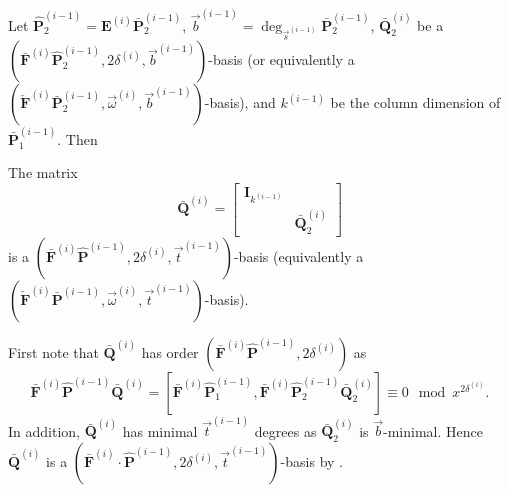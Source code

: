 Let $\hat{\mathbf{P}}_{2}^{\left(i-1\right)}=\mathbf{E}^{\left(i\right)}\bar{\mathbf{P}}_{2}^{\left(i-1\right)}$,
$\vec{b}^{\left(i-1\right)}=\deg_{\vec{s}^{\left(i-1\right)}}\bar{\mathbf{P}}_{2}^{\left(i-1\right)}$,
$\bar{\mathbf{Q}}_{2}^{\left(i\right)}$ be a $(\bar{\mathbf{F}}^{\left(i\right)}\hat{\mathbf{P}}_{2}^{\left(i-1\right)},2\delta^{\left(i\right)},\vec{b}^{\left(i-1\right)})$-basis
(or equivalently a $(\check{\mathbf{F}}^{\left(i\right)}\bar{\mathbf{P}}_{2}^{\left(i-1\right)},\vec{\omega}^{\left(i\right)},\vec{b}^{\left(i-1\right)})$-basis),
and $k^{\left(i-1\right)}$ be the column dimension of $\bar{\mathbf{P}}_{1}^{\left(i-1\right)}$.
Then 
\begin{lem}
\label{lem:disregardComputedBasisElements} The matrix \[
\bar{\mathbf{Q}}^{\left(i\right)}=\left[\begin{array}{cc}
\mathbf{I}_{k^{\left(i-1\right)}}\\
 & \bar{\mathbf{Q}}_{2}^{\left(i\right)}\end{array}\right]\]
 is a $(\bar{\mathbf{F}}^{\left(i\right)}\hat{\mathbf{P}}^{\left(i-1\right)},2\delta^{\left(i\right)},\vec{t}^{\left(i-1\right)})$-basis
(equivalently a $(\check{\mathbf{F}}^{\left(i\right)}\bar{\mathbf{P}}^{\left(i-1\right)},\vec{\omega}^{\left(i\right)},\vec{t}^{\left(i-1\right)})$-basis).\end{lem}
\begin{pf}
First note that $\bar{\mathbf{Q}}^{\left(i\right)}$ has order $(\bar{\mathbf{F}}^{\left(i\right)}\hat{\mathbf{P}}^{\left(i-1\right)},2\delta^{\left(i\right)})$
as \[
\bar{\mathbf{F}}^{\left(i\right)}\hat{\mathbf{P}}^{\left(i-1\right)}\bar{\mathbf{Q}}^{\left(i\right)}=[\bar{\mathbf{F}}^{\left(i\right)}\hat{\mathbf{P}}_{1}^{\left(i-1\right)},\bar{\mathbf{F}}^{\left(i\right)}\hat{\mathbf{P}}_{2}^{\left(i-1\right)}\bar{\mathbf{Q}}_{2}^{\left(i\right)}]\equiv0\mod x^{2\delta^{\left(i\right)}}.\]
 In addition, $\bar{\mathbf{Q}}^{\left(i\right)}$ has minimal $\vec{t}^{\left(i-1\right)}$
degrees as $\bar{\mathbf{Q}}_{2}^{\left(i\right)}$ is $\vec{b}$-minimal.
Hence $\bar{\mathbf{Q}}^{\left(i\right)}$ is a $(\bar{\mathbf{F}}^{\left(i\right)}\cdot\hat{\mathbf{P}}^{\left(i-1\right)},2\delta^{\left(i\right)},\vec{t}^{\left(i-1\right)})$-basis
by . 
\end{pf}
%
\begin{comment}
Alternatively, one can also argue that since $\hat{\mathbf{P}}_{1}^{\left(i-1\right)}$
already has order $(\bar{\mathbf{F}}^{\left(i\right)},2\delta^{\left(i\right)})$,
it cannot contribute in any way to and cannot be affected in any way
by the computations of a $(\bar{\mathbf{F}}^{\left(i\right)}\hat{\mathbf{P}}^{\left(i-1\right)},2\delta^{\left(i\right)},\vec{b}^{\left(i-1\right)})$-basis,
hence it is sufficient to just use $\bar{\mathbf{F}}^{\left(i\right)}\hat{\mathbf{P}}_{2}^{\left(i-1\right)}$
to compute a $(\bar{\mathbf{F}}^{\left(i\right)}\cdot\hat{\mathbf{P}}_{2}^{\left(i-1\right)},2\delta^{\left(i\right)},\vec{b}^{\left(i-1\right)})$-basis. 
\end{comment}
{}

